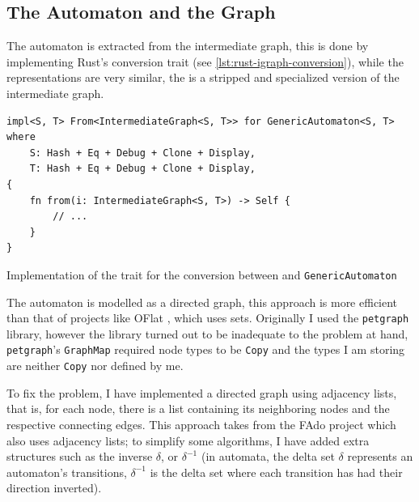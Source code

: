 \subsection{The Automaton and the Graph}\label{sec:validation:automaton}

The automaton is extracted from the intermediate graph,
this is done by implementing Rust's  conversion trait (see \autoref{lst:rust-igraph-conversion}),
while the representations are very similar, the  is a stripped and specialized version of the intermediate graph.

\begin{listing}
    \begin{verbatim}
impl<S, T> From<IntermediateGraph<S, T>> for GenericAutomaton<S, T>
where
    S: Hash + Eq + Debug + Clone + Display,
    T: Hash + Eq + Debug + Clone + Display,
{
    fn from(i: IntermediateGraph<S, T>) -> Self {
        // ...
    }
}
    \end{verbatim}
    \caption{Implementation of the  trait for the conversion between  and \texttt{GenericAutomaton}}
    \label{lst:rust-igraph-conversion}
\end{listing}


The automaton is modelled as a directed graph, this approach is more efficient than that of projects like OFlat \autocite{Macedo2019}, which uses sets.
Originally I used the \texttt{petgraph} library,
however the library turned out to be inadequate to the problem at hand,
\texttt{petgraph}'s \texttt{GraphMap}
required node types to be \texttt{Copy} and
the types I am storing are neither \texttt{Copy} nor defined by me.

To fix the problem, I have implemented a directed graph using adjacency lists, that is, for each node,
there is a list containing its neighboring nodes and the respective connecting edges.
This approach takes from the FAdo \autocite{Reis2002} project which also uses adjacency lists; to simplify some algorithms, %
I have added extra structures such as the inverse $\delta$, or $\delta^{-1}$
(in automata, the delta set $\delta$ represents an automaton's transitions,
$\delta^{-1}$ is the delta set where each transition has had their direction inverted).


